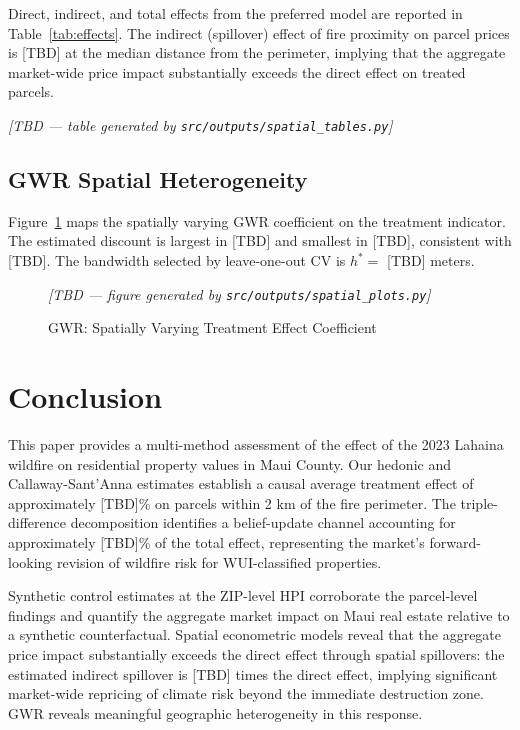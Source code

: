 \documentclass[12pt]{article}
\begin{document}
Direct, indirect, and total effects from the preferred model are reported in
Table~\ref{tab:effects}. The indirect (spillover) effect of fire proximity on
parcel prices is [TBD] at the median distance from the perimeter, implying that
the aggregate market-wide price impact substantially exceeds the direct effect
on treated parcels.

\begin{table}[H]
\caption{LeSage-Pace Direct, Indirect, and Total Effects}
\label{tab:effects}
\centering
% 
\textit{[TBD --- table generated by \texttt{src/outputs/spatial\_tables.py}]}
\end{table}

\subsection{GWR Spatial Heterogeneity}

Figure~\ref{fig:gwr} maps the spatially varying GWR coefficient on the treatment
indicator. The estimated discount is largest in [TBD] and smallest in [TBD],
consistent with [TBD]. The bandwidth selected by leave-one-out CV is $h^* = $ [TBD]
meters.

\begin{figure}[H]
\centering
\textit{[TBD --- figure generated by \texttt{src/outputs/spatial\_plots.py}]}
\caption{GWR: Spatially Varying Treatment Effect Coefficient}
\label{fig:gwr}
\end{figure}

\section{Conclusion}
\label{sec:conclusion}

This paper provides a multi-method assessment of the effect of the 2023 Lahaina
wildfire on residential property values in Maui County. Our hedonic and
Callaway-Sant'Anna estimates establish a causal average treatment effect of
approximately [TBD]\% on parcels within 2 km of the fire perimeter. The
triple-difference decomposition identifies a belief-update channel accounting for
approximately [TBD]\% of the total effect, representing the market's forward-looking
revision of wildfire risk for WUI-classified properties.

Synthetic control estimates at the ZIP-level HPI corroborate the parcel-level
findings and quantify the aggregate market impact on Maui real estate relative to
a synthetic counterfactual. Spatial econometric models reveal that the aggregate
price impact substantially exceeds the direct effect through spatial spillovers:
the estimated indirect spillover is [TBD] times the direct effect, implying
significant market-wide repricing of climate risk beyond the immediate destruction
zone. GWR reveals meaningful geographic heterogeneity in this response.
\end{document}
